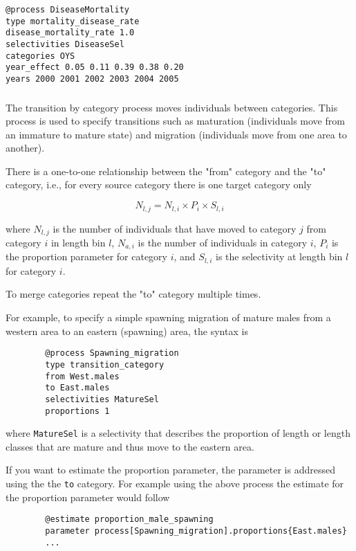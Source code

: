 {\small{\begin{verbatim}
@process DiseaseMortality
type mortality_disease_rate
disease_mortality_rate 1.0
selectivities DiseaseSel 
categories OYS
year_effect 0.05 0.11 0.39 0.38 0.20 
years 2000 2001 2002 2003 2004 2005 
		\end{verbatim}}}
\subsubsection{}\label{sec:Process-Length-TransitionCategory}
The transition by category process moves individuals between categories. This process is used to specify transitions such as maturation (individuals move from an immature to mature state) and migration (individuals move from one area to another).

There is a one-to-one relationship between the "from" category and the "to" category, i.e., for every source category there is one target category only

\begin{equation}
N_{l,j} = N_{l,i} \times P_i \times S_{l,i}
\end{equation}

where $N_{l,j}$ is the number of individuals that have moved to category $j$ from category $i$ in length bin $l$, $N_{a,i}$ is the number of individuals in category $i$, $P_i$ is the proportion parameter for category $i$, and $S_{l,i}$ is the selectivity at length bin $l$ for category $i$.

To merge categories repeat the "to" category multiple times.

For example, to specify a simple spawning migration of mature males from a western area to an eastern (spawning) area, the syntax is

{\small{\begin{verbatim}
		@process Spawning_migration
		type transition_category
		from West.males
		to East.males
		selectivities MatureSel
		proportions 1
		\end{verbatim}}}

where \texttt{MatureSel} is a selectivity that describes the proportion of length or length classes that are mature and thus move to the eastern area.

If you want to estimate the proportion parameter, the parameter is addressed using the the \texttt{to} category. For example using the above process the estimate for the proportion parameter would follow

{\small{\begin{verbatim}
		@estimate proportion_male_spawning
		parameter process[Spawning_migration].proportions{East.males}
		...
		\end{verbatim}}}



